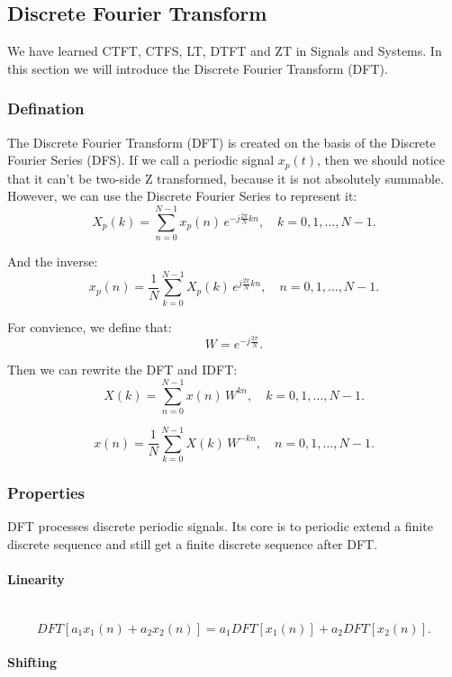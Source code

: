 \documentclass[12pt]{ctexart}
\begin{document}
\fontsize{12}{14}
\newpage
\subsection{\textbf{Discrete Fourier Transform}}

We have learned CTFT, CTFS, LT, DTFT and ZT in Signals and Systems. In this section
we will introduce the Discrete Fourier Transform (DFT).

\subsubsection{\textbf{Defination}}

The Discrete Fourier Transform (DFT) is created on the basis of the Discrete
Fourier Series (DFS). If we call a periodic signal $x_p(t)$, then we should notice
that it can't be two-side Z transformed, because it is not absolutely summable.
However, we can use the Discrete Fourier Series to represent it:
\[
  X_p(k) = \sum_{n=0}^{N-1} x_p(n)\,e^{-j\frac{2\pi}{N}kn},\quad k=0,1,\dots,N-1.
\]

And the inverse:
\[
  x_p(n) = \frac{1}{N}\sum_{k=0}^{N-1} X_p(k)\,e^{j\frac{2\pi}{N}kn},\quad n=0,1,
  \dots,N-1.
\]

For convience, we define that:
\[
  W = e^{-j\frac{2\pi}{N}}.
\]

Then we can rewrite the DFT and IDFT:
\[
  X(k) = \sum_{n=0}^{N-1} x(n)\,W^{kn},\quad k=0,1,\dots,N-1.
\]

\[
  x(n) = \frac{1}{N}\sum_{k=0}^{N-1} X(k)\,W^{-kn},\quad n=0,1,\dots,N-1.
\]

\subsubsection{\textbf{Properties}}

DFT processes discrete periodic signals. Its core is to periodic extend a finite
discrete sequence and still get a finite discrete sequence after DFT.

\paragraph{\textbf{Linearity}}\mbox{}\\
\[
  DFT[a_1x_1(n) + a_2x_2(n)] = a_1DFT[x_1(n)] + a_2DFT[x_2(n)].
\]

\paragraph{\textbf{Shifting}}\mbox{}\\
\end{document}
